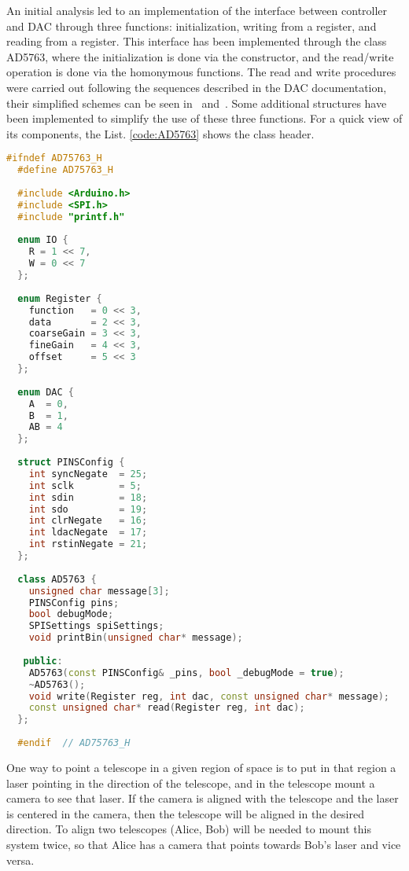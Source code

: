 An initial analysis led to an implementation of the interface between controller and DAC through three functions: initialization, writing from a register, and reading from a register. This interface has been implemented through the class AD5763, where the initialization is done via the constructor, and the read/write operation is done via the homonymous functions. The read and write procedures were carried out following the sequences described in the DAC documentation, their simplified schemes can be seen in~ and~. Some additional structures have been implemented to simplify the use of these three functions.
For a quick view of its components, the List. \ref{code:AD5763} shows the class header.
\begin{lstlisting}[language=c++, gobble=2, label=code:AD5763]
  #ifndef AD75763_H
  #define AD75763_H
  
  #include <Arduino.h>
  #include <SPI.h>
  #include "printf.h"
  
  enum IO {
    R = 1 << 7,
    W = 0 << 7
  };
  
  enum Register {
    function   = 0 << 3,
    data       = 2 << 3,
    coarseGain = 3 << 3,
    fineGain   = 4 << 3,
    offset     = 5 << 3
  };
  
  enum DAC {
    A  = 0,
    B  = 1,
    AB = 4
  };
  
  struct PINSConfig {
    int syncNegate  = 25;
    int sclk        = 5;
    int sdin        = 18;
    int sdo         = 19;
    int clrNegate   = 16;
    int ldacNegate  = 17;
    int rstinNegate = 21;
  };
  
  class AD5763 {
    unsigned char message[3];
    PINSConfig pins;
    bool debugMode;
    SPISettings spiSettings;
    void printBin(unsigned char* message);
  
   public:
    AD5763(const PINSConfig& _pins, bool _debugMode = true);
    ~AD5763();
    void write(Register reg, int dac, const unsigned char* message);
    const unsigned char* read(Register reg, int dac);
  };
  
  #endif  // AD75763_H
\end{lstlisting}


One way to point a telescope in a given region of space is to put in that region a laser pointing in the direction of the telescope, and in the telescope mount a camera to see that laser.
If the camera is aligned with the telescope and the laser is centered in the camera, then the telescope will be aligned in the desired direction.
To align two telescopes (Alice, Bob) will be needed to mount this system twice, so that Alice has a camera that points towards Bob’s laser and vice versa.

